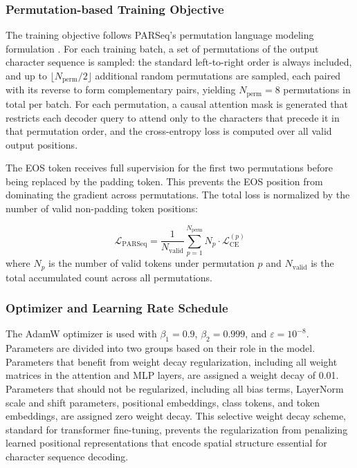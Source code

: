 \subsubsection{Permutation-based Training Objective}
The training objective follows PARSeq's permutation language modeling formulation \cite{Bautista2022}. For each training batch, a set of permutations of the output character sequence is sampled: the standard left-to-right order is always included, and up to $\lfloor N_{\text{perm}} / 2 \rfloor$ additional random permutations are sampled, each paired with its reverse to form complementary pairs, yielding $N_{\text{perm}} = 8$ permutations in total per batch. For each permutation, a causal attention mask is generated that restricts each decoder query to attend only to the characters that precede it in that permutation order, and the cross-entropy loss is computed over all valid output positions.

The EOS token receives full supervision for the first two permutations before being replaced by the padding token. This prevents the EOS position from dominating the gradient across permutations. The total loss is normalized by the number of valid non-padding token positions:

\begin{equation}
\mathcal{L}_{\text{PARSeq}} = \frac{1}{N_{\text{valid}}} \sum_{p=1}^{N_{\text{perm}}} N_p \cdot \mathcal{L}_{\text{CE}}^{(p)}
\end{equation}
where $N_p$ is the number of valid tokens under permutation $p$ and $N_{\text{valid}}$ is the total accumulated count across all permutations.

\subsubsection{Optimizer and Learning Rate Schedule}
The AdamW optimizer is used with $\beta_1 = 0.9$, $\beta_2 = 0.999$, and $\varepsilon = 10^{-8}$. Parameters are divided into two groups based on their role in the model. Parameters that benefit from weight decay regularization, including all weight matrices in the attention and MLP layers, are assigned a weight decay of 0.01. Parameters that should not be regularized, including all bias terms, LayerNorm scale and shift parameters, positional embeddings, class tokens, and token embeddings, are assigned zero weight decay. This selective weight decay scheme, standard for transformer fine-tuning, prevents the regularization from penalizing learned positional representations that encode spatial structure essential for character sequence decoding.

